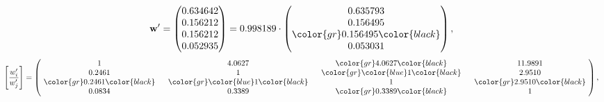 \begin{example}
\begin{equation*}
\mathbf{w}^{\prime} =
\begin{pmatrix}
0.634642\\
0.156212\\
0.156212\\
0.052935
\end{pmatrix} =
0.998189\cdot
\begin{pmatrix}
0.635793\\
0.156495\\
\color{gr} 0.156495\color{black} \\
0.053031
\end{pmatrix},
\end{equation*}
\begin{equation*}
\left[ \frac{{w}^{\prime}_i}{{w}^{\prime}_j} \right] =
\begin{pmatrix}
$\,\,$ 1 $\,\,$ & $\,\,$4.0627$\,\,$ & $\,\,$\color{gr} 4.0627\color{black} $\,\,$ & $\,\,$11.9891$\,\,$ \\
$\,\,$0.2461$\,\,$ & $\,\,$ 1 $\,\,$ & $\,\,$\color{gr} \color{blue} 1\color{black} $\,\,$ & $\,\,$2.9510  $\,\,$ \\
$\,\,$\color{gr} 0.2461\color{black} $\,\,$ & $\,\,$\color{gr} \color{blue} 1\color{black} $\,\,$ & $\,\,$ 1 $\,\,$ & $\,\,$\color{gr} 2.9510\color{black}  $\,\,$ \\
$\,\,$0.0834$\,\,$ & $\,\,$0.3389$\,\,$ & $\,\,$\color{gr} 0.3389\color{black} $\,\,$ & $\,\,$ 1  $\,\,$ \\
\end{pmatrix},
\end{equation*}
\end{example}
\newpage
